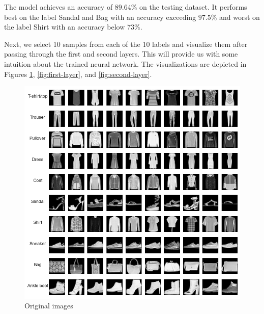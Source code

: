 \documentclass[10pt,a4paper,twoside]{tau}
\begin{document}
The model achieves an accuracy of $89.64\%$ on the testing dataset. It performs best on the label Sandal and Bag with an accuracy exceeding $97.5\%$ and worst on the label Shirt with an accuracy below $73\%$.

Next, we select 10 samples from each of the 10 labels and visualize them after passing through the first and second layers. This will provide us with some intuition about the trained neural network. The visualizations are depicted in Figures \ref{fig:original-image}, \ref{fig:first-layer}, and \ref{fig:second-layer}.

\begin{figure}[htbp]
\centering
\includegraphics[scale=0.43]{images/original_image.png}
\caption{Original images}
\label{fig:original-image}
\end{figure}
\end{document}

